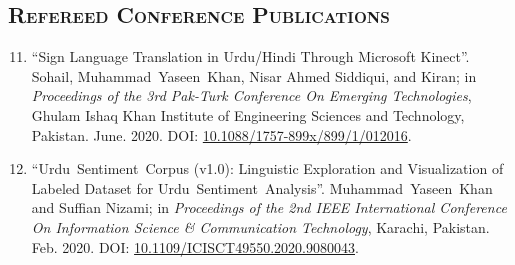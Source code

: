 \documentclass[a4paper, 10pt]{article}
\begin{document}
\subsection*{\normalfont\textsc{Refereed Conference Publications}}
\begin{enumerate}
\setcounter{enumi}{10}
\itemsep-4pt 








\item ``Sign Language Translation in Urdu/Hindi Through Microsoft Kinect''. Sohail, \textcolor{NavyBlue}{Muhammad~Yaseen~Khan}, Nisar Ahmed Siddiqui, and Kiran; in \emph{Proceedings of the 3rd Pak-Turk Conference On Emerging Technologies}, Ghulam Ishaq Khan Institute of Engineering Sciences and Technology, Pakistan. June. 2020. DOI: \href{https://dpi.org/10.1088/1757-899x/899/1/012016}{10.1088/1757-899x/899/1/012016}.

\item ``Urdu~Sentiment~Corpus (v1.0): Linguistic Exploration and Visualization of Labeled Dataset for Urdu~Sentiment~Analysis''. \textcolor{NavyBlue}{Muhammad~Yaseen~Khan} and Suffian Nizami; in \emph{Proceedings of the 2nd IEEE International Conference On Information Science \& Communication Technology}, Karachi, Pakistan. Feb. 2020. DOI: \href{https://doi.org/10.1109/ICISCT49550.2020.9080043}{10.1109/ICISCT49550.2020.9080043}.


\end{enumerate}
\end{document}
